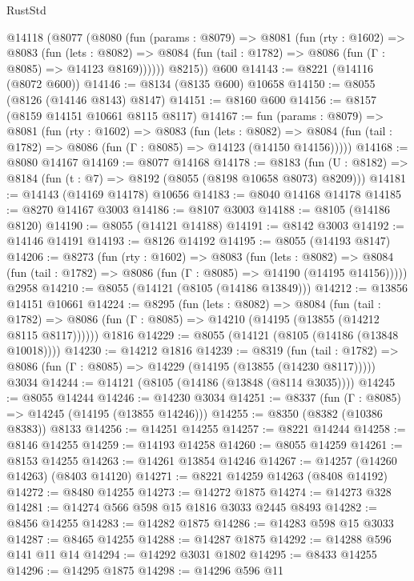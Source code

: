 \begin{lexlean}{RustStd}
\begin{coremodule}
    @14118
      (@8077
        (@8080
          (fun (params : @8079) =>
          @8081
            (fun (rty : @1602) =>
            @8083
              (fun (lets : @8082) =>
              @8084 (fun (tail : @1782) => @8086 (fun (Γ : @8085) => @14123 @8169))))))
        @8215))
    @600
@14143 := @8221 (@14116 (@8072 @600))
@14146 := @8134 (@8135 @600) @10658
@14150 := @8055 (@8126 (@14146 @8143) @8147)
@14151 := @8160 @600
@14156 := @8157 (@8159 @14151 @10661 @8115 @8117)
@14167 := fun (params : @8079) =>
  @8081
    (fun (rty : @1602) =>
    @8083
      (fun (lets : @8082) =>
      @8084 (fun (tail : @1782) => @8086 (fun (Γ : @8085) => @14123 (@14150 @14156)))))
@14168 := @8080 @14167
@14169 := @8077 @14168
@14178 := @8183
    (fun (U : @8182) => @8184 (fun (t : @7) => @8192 (@8055 (@8198 @10658 @8073) @8209)))
@14181 := @14143 (@14169 @14178) @10656
@14183 := @8040 @14168 @14178
@14185 := @8270 @14167 @3003
@14186 := @8107 @3003
@14188 := @8105 (@14186 @8120)
@14190 := @8055 (@14121 @14188)
@14191 := @8142 @3003
@14192 := @14146 @14191
@14193 := @8126 @14192
@14195 := @8055 (@14193 @8147)
@14206 := @8273
    (fun (rty : @1602) =>
    @8083
      (fun (lets : @8082) =>
      @8084 (fun (tail : @1782) => @8086 (fun (Γ : @8085) => @14190 (@14195 @14156)))))
    @2958
@14210 := @8055 (@14121 (@8105 (@14186 @13849)))
@14212 := @13856 @14151 @10661
@14224 := @8295
    (fun (lets : @8082) =>
    @8084
      (fun (tail : @1782) =>
      @8086 (fun (Γ : @8085) => @14210 (@14195 (@13855 (@14212 @8115 @8117))))))
    @1816
@14229 := @8055 (@14121 (@8105 (@14186 (@13848 @10018))))
@14230 := @14212 @1816
@14239 := @8319
    (fun (tail : @1782) => @8086 (fun (Γ : @8085) => @14229 (@14195 (@13855 (@14230 @8117)))))
    @3034
@14244 := @14121 (@8105 (@14186 (@13848 (@8114 @3035))))
@14245 := @8055 @14244
@14246 := @14230 @3034
@14251 := @8337 (fun (Γ : @8085) => @14245 (@14195 (@13855 @14246)))
@14255 := @8350 (@8382 (@10386 @8383)) @8133
@14256 := @14251 @14255
@14257 := @8221 @14244
@14258 := @8146 @14255
@14259 := @14193 @14258
@14260 := @8055 @14259
@14261 := @8153 @14255
@14263 := @14261 @13854 @14246
@14267 := @14257 (@14260 @14263) (@8403 @14120)
@14271 := @8221 @14259 @14263 (@8408 @14192)
@14272 := @8480 @14255
@14273 := @14272 @1875
@14274 := @14273 @328
@14281 := @14274 @566 @598 @15 @1816 @3033 @2445 @8493
@14282 := @8456 @14255
@14283 := @14282 @1875
@14286 := @14283 @598 @15 @3033
@14287 := @8465 @14255
@14288 := @14287 @1875
@14292 := @14288 @596 @141 @11 @14
@14294 := @14292 @3031 @1802
@14295 := @8433 @14255
@14296 := @14295 @1875
@14298 := @14296 @596 @11

\end{coremodule}
\end{lexlean}
